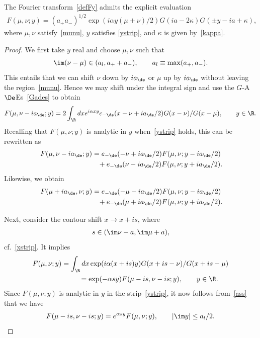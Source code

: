 \documentclass[pdftex]{sigma}
\numberwithin{equation}{section}
\begin{document}
\begin{prop}\label{propositionC.1}
The Fourier transform~\eqref{defFy} admits the explicit evaluation
\begin{gather}\label{FFt}
F(\mu,\nu;y)=(a_{+}a_{-})^{1/2}\exp(i\alpha y(\mu+\nu)/2)G(ia-2\kappa)G(\pm y-ia+\kappa),
\end{gather}
where $\mu,\nu$ satisfy~\eqref{munu}, $y$ satisfies \eqref{ystrip}, and $\kappa$ is given by~\eqref{kappa}.
\end{prop}
\begin{proof}
We f\/irst take $y$ real and choose $\mu,\nu$ such that
\begin{gather}\label{ass}
\im(\nu-\mu)\in  (a_l,a_{+}+a_{-}),\qquad a_l\equiv \max(a_{+},a_{-}).
\end{gather}
This entails that we can shift $\nu$ down by $ia_{\de}$ or $\mu$ up by $ia_{\de}$ without leaving the region~\eqref{munu}. Hence we may shift under the integral sign and use the $G$-A$\De$Es~\eqref{Gades} to obtain
\begin{gather}
F(\mu,\nu-ia_{\de};y)=2\int_{\R}dxe^{i\alpha xy}c_{-\de}(x-\nu+ia_{\de}/2)G(x-\nu)/G(x-\mu),\qquad y\in\R.
\end{gather}
Recalling that $F(\mu,\nu;y)$ is analytic in $y$ when~\eqref{ystrip} holds, this can be rewritten as
\begin{gather}
F(\mu,\nu-ia_{\de};y)=e_{-\de}(-\nu+ia_{\de}/2)F(\mu,\nu;y-ia_{\de}/2)\nonumber\\
\phantom{F(\mu,\nu-ia_{\de};y)=}{}
+e_{-\de}(\nu-ia_{\de}/2)F(\mu,\nu;y+ia_{\de}/2).\label{Fs1}
\end{gather}
Likewise, we obtain
\begin{gather}
F(\mu+ia_{\de},\nu;y)=e_{-\de}(-\mu-ia_{\de}/2)F(\mu,\nu;y-ia_{\de}/2)\nonumber\\
\phantom{F(\mu+ia_{\de},\nu;y)=}{}
+e_{-\de}(\mu+ia_{\de}/2)F(\mu,\nu;y+ia_{\de}/2).\label{Fs2}
\end{gather}

Next, consider the contour shift $x\to x+is$, where
\begin{gather}
s\in (\im\nu-a,\im \mu+a),
\end{gather}
cf.~\eqref{xstrip}. It implies
\begin{gather}
F(\mu,\nu;y)     =     \int_{\R}dx\exp(i\alpha (x+is)y)G(x+is-\nu)/G(x+is-\mu)
\nonumber \\
\phantom{F(\mu,\nu;y)     =}{}  =    \exp(-\alpha sy)F(\mu-is,\nu-is;y),\qquad y\in\R.\label{xshi}
\end{gather}
Since $F(\mu,\nu;y)$ is analytic in $y$ in the strip~\eqref{ystrip}, it now follows from~\eqref{ass} that we have
\begin{gather}\label{Fkey}
F(\mu-is,\nu-is;y)=e^{\alpha sy}F(\mu,\nu;y),\qquad |\im y|\le a_l/2.
\end{gather}


\end{proof}
\end{document}
